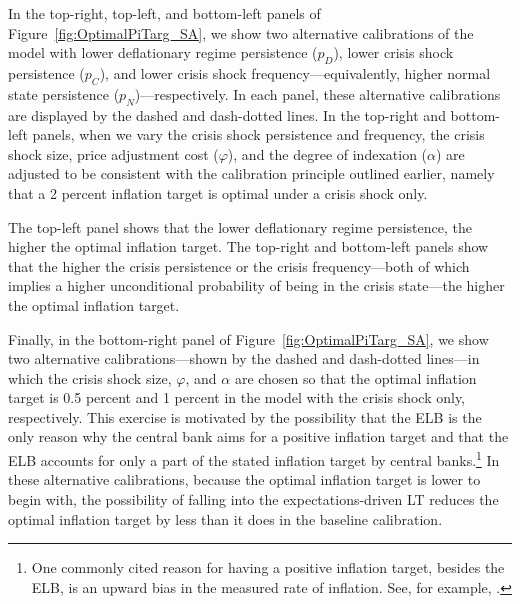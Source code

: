 \documentclass[11pt]{article}
\begin{document}
	In the top-right, top-left, and bottom-left panels of Figure~\ref{fig:OptimalPiTarg_SA}, we show two alternative calibrations of the model with lower deflationary regime persistence ($p_{D}$), lower crisis shock persistence ($p_{C}$), and lower crisis shock frequency---equivalently, higher normal state persistence ($p_{N}$)---respectively. In each panel, these alternative calibrations are displayed by the dashed and dash-dotted lines. In the top-right and bottom-left panels, when we vary the crisis shock persistence and frequency, the crisis shock size, price adjustment cost ($\varphi$), and the degree of indexation ($\alpha$) are adjusted to be consistent with the calibration principle outlined earlier, namely that a 2 percent inflation target is optimal under a crisis shock only.

	The top-left panel shows that the lower deflationary regime persistence, the higher the optimal inflation target. The top-right and bottom-left panels show that the higher the crisis persistence or the crisis frequency---both of which implies a higher unconditional probability of being in the crisis state---the higher the optimal inflation target.


	Finally, in the bottom-right panel of Figure~\ref{fig:OptimalPiTarg_SA}, we show two alternative calibrations---shown by the dashed and dash-dotted lines---in which the crisis shock size, $\varphi$, and $\alpha$ are chosen so that the optimal inflation target is 0.5 percent and 1 percent in the model with the crisis shock only, respectively. This exercise is motivated by the possibility that the ELB is the only reason why the central bank aims for a positive inflation target and that the ELB accounts for only a part of the stated inflation target by central banks.\footnote{One commonly cited reason for having a positive inflation target, besides the ELB, is an upward bias in the measured rate of inflation. See, for example, \citet{KileyMauskopfWilcox2007}.} In these alternative calibrations, because the optimal inflation target is lower to begin with, the possibility of falling into the expectations-driven LT reduces the optimal inflation target by less than it does in the baseline calibration.
\end{document}

